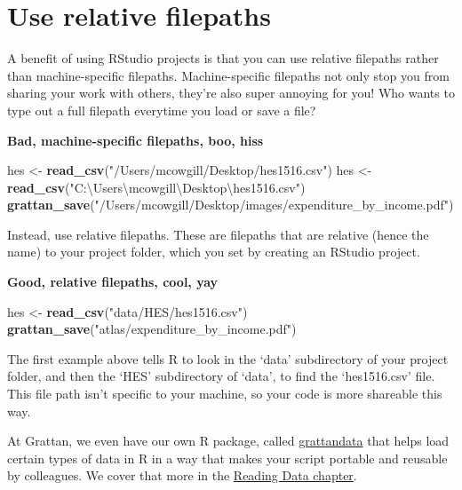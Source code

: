 \documentclass[]{book}
\newenvironment{Shaded}{\begin{snugshade}}{\end{snugshade}}
\newcommand{\KeywordTok}[1]{\textcolor[rgb]{0.13,0.29,0.53}{\textbf{#1}}}
\newcommand{\NormalTok}[1]{#1}
\newcommand{\StringTok}[1]{\textcolor[rgb]{0.31,0.60,0.02}{#1}}
\begin{document}
\hypertarget{use-relative-filepaths}{%
\section{Use relative filepaths}\label{use-relative-filepaths}}

A benefit of using RStudio projects is that you can use relative filepaths rather than machine-specific filepaths. Machine-specific filepaths not only stop you from sharing your work with others, they're also super annoying for you! Who wants to type out a full filepath everytime you load or save a file?

\textbf{Bad, machine-specific filepaths, boo, hiss}

\begin{Shaded}
\begin{Highlighting}[]
\NormalTok{hes <-}\StringTok{ }\KeywordTok{read_csv}\NormalTok{(}\StringTok{"/Users/mcowgill/Desktop/hes1516.csv"}\NormalTok{)}
\NormalTok{hes <-}\StringTok{ }\KeywordTok{read_csv}\NormalTok{(}\StringTok{"C:\textbackslash{}Users\textbackslash{}mcowgill\textbackslash{}Desktop\textbackslash{}hes1516.csv"}\NormalTok{)}
\KeywordTok{grattan_save}\NormalTok{(}\StringTok{"/Users/mcowgill/Desktop/images/expenditure_by_income.pdf"}\NormalTok{)}
\end{Highlighting}
\end{Shaded}

Instead, use relative filepaths. These are filepaths that are relative (hence the name) to your project folder, which you set by creating an RStudio project.

\textbf{Good, relative filepaths, cool, yay}

\begin{Shaded}
\begin{Highlighting}[]
\NormalTok{hes <-}\StringTok{ }\KeywordTok{read_csv}\NormalTok{(}\StringTok{"data/HES/hes1516.csv"}\NormalTok{)}
\KeywordTok{grattan_save}\NormalTok{(}\StringTok{"atlas/expenditure_by_income.pdf"}\NormalTok{)}
\end{Highlighting}
\end{Shaded}

The first example above tells R to look in the `data' subdirectory of your project folder, and then the `HES' subdirectory of `data', to find the `hes1516.csv' file. This file path isn't specific to your machine, so your code is more shareable this way.

At Grattan, we even have our own R package, called \href{https://github.com/grattan/grattandata}{grattandata} that helps load certain types of data in R in a way that makes your script portable and reusable by colleagues. We cover that more in the \protect\hyperlink{read_microdata}{Reading Data chapter}.
\end{document}
